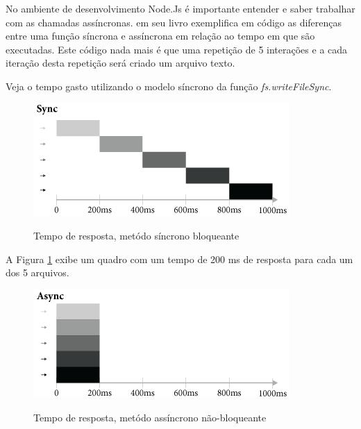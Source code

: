   No ambiente de desenvolvimento Node.Js é importante entender e saber trabalhar com as chamadas assíncronas. 
  \cite{Pereira:2013} em seu livro exemplifica em código as diferenças entre uma função síncrona e assíncrona 
  em relação ao tempo em que são executadas. Este código nada mais é que uma repetição de 5 interações e a cada 
  iteração desta repetição será criado um arquivo texto.
  
  Veja o tempo gasto utilizando o modelo síncrono da função \textit{fs.writeFileSync}.
  
  \begin{figure}[H]
  \setlength{\abovecaptionskip}{0pt}
  \setlength{\belowcaptionskip}{0pt}
  \caption[Tempo de resposta, metódo síncrono bloqueante]{Tempo de resposta, metódo síncrono bloqueante}
  \centering
  \includegraphics[width=.85\textwidth]{imagem/timeline-node-sync-caio-ribeiro.png}
  \captionsetup{justification=centering}
  \label{fig:timeline-sync}
  \end{figure}
  
  A Figura \ref{fig:timeline-sync} exibe um quadro com um tempo de 200 ms de resposta para cada um dos 5 arquivos.

  \begin{figure}[H]
  \setlength{\abovecaptionskip}{0pt}
  \setlength{\belowcaptionskip}{0pt}
  \caption[Tempo de resposta, metódo assíncrono não-bloqueante]{Tempo de resposta, metódo assíncrono não-bloqueante}
  \centering
  \includegraphics[width=.85\textwidth]{imagem/timeline-node-async-caio-ribeiro.png}
  \captionsetup{justification=centering}
  \label{fig:timeline-async}
  \end{figure}

